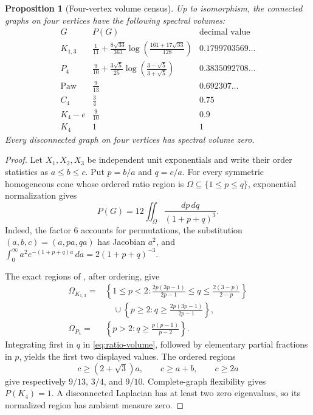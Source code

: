 \documentclass[11pt,reqno]{amsart}
\newtheorem{proposition}[theorem]{Proposition}
\theoremstyle{definition}
\theoremstyle{remark}
\begin{document}
\begin{proposition}[Four-vertex volume census]
\label{prop:four-vertex-census}
Up to isomorphism, the connected graphs on four vertices have the following
spectral volumes:
\[
\begin{array}{c|c|c}
G&P(G)&\text{decimal value}\\ \hline
K_{1,3}&
\displaystyle \frac1{11}+\frac{8\sqrt{33}}{363}
 \log\!\left(\frac{161+17\sqrt{33}}{128}\right)
&0.1799703569\ldots\\[2mm]
P_4&
\displaystyle \frac9{10}+\frac{3\sqrt5}{25}
 \log\!\left(\frac{3-\sqrt5}{3+\sqrt5}\right)
&0.3835092708\ldots\\[2mm]
\mathrm{Paw}&\displaystyle\frac9{13}&0.692307\ldots\\[1mm]
C_4&\displaystyle\frac34&0.75\\[1mm]
K_4-e&\displaystyle\frac9{10}&0.9\\[1mm]
K_4&1&1
\end{array}
\]
Every disconnected graph on four vertices has spectral volume zero.
\end{proposition}

\begin{proof}
Let $X_1,X_2,X_3$ be independent unit exponentials and write their order
statistics as $a\le b\le c$.  Put $p=b/a$ and $q=c/a$.  For every symmetric
homogeneous cone whose ordered ratio region is
$\Omega\subseteq\{1\le p\le q\}$, exponential normalization gives
\begin{equation}\label{eq:ratio-volume}
  P(G)=12\iint_\Omega\frac{dp\,dq}{(1+p+q)^3}.
\end{equation}
Indeed, the factor $6$ accounts for permutations, the substitution
$(a,b,c)=(a,pa,qa)$ has Jacobian $a^2$, and
$\int_0^\infty a^2e^{-(1+p+q)a}\,da=2(1+p+q)^{-3}$.

The exact regions of \cite[Theorems~3.1--6.1]{EJT2026}, after ordering,
give
\begin{align*}
\Omega_{K_{1,3}}
={}&\left\{1\le p<2:
 \frac{2p(3p-1)}{2p-1}\le q\le\frac{2(3-p)}{2-p}\right\}\\
&\quad\cup\left\{p\ge2:
 q\ge\frac{2p(3p-1)}{2p-1}\right\},\\
\Omega_{P_4}
={}&\left\{p>2:q\ge\frac{p(p-1)}{p-2}\right\}.
\end{align*}
Integrating first in $q$ in \eqref{eq:ratio-volume}, followed by elementary
partial fractions in $p$, yields the first two displayed values.  The
ordered regions
\[
  c\ge(2+\sqrt3)a,\qquad c\ge a+b,
  \qquad c\ge2a
\]
give respectively $9/13$, $3/4$, and $9/10$.  Complete-graph flexibility
gives $P(K_4)=1$.  A disconnected Laplacian has at least two zero
eigenvalues, so its normalized region has ambient measure zero.
\end{proof}
\end{document}

